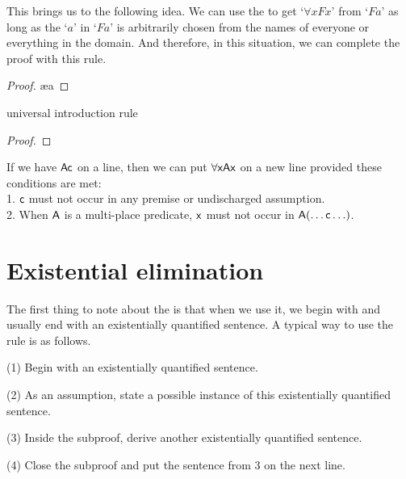 This brings us to the following idea. We can use the  to get `$\forall x Fx$' from `$Fa$' as long as the `$a$' in `$Fa$' is arbitrarily chosen from the names of everyone or everything in the domain. And therefore, in this situation, we can complete the proof with this rule.

\begin{proof}
	 \pr{}
	 
	 \ae{a}
	 
\end{proof}

\begin{factboxy}{universal introduction rule}
\begin{proof}
	 
\end{proof}

\small{If we have $\mathsf{Ac}$ on a line, then we can put $\forall \mathsf{xAx}$ on a new line provided these conditions are met:\\
1. $\mathsf{c}$ must not occur in any premise or undischarged assumption.\\
2. When $\mathsf{A}$ is a multi-place predicate, $\mathsf{x}$ must not occur in $\mathsf{A(\ldots c\ldots)}$.
}
\end{factboxy}



\section{Existential elimination}

The first thing to note about the  is that when we use it, we begin with and usually end with an existentially quantified sentence. A typical way to use the rule is as follows. 

\begin{ebullet}
\item[(1)] Begin with an existentially quantified sentence. 
\item[(2)] As an assumption, state a possible instance of this existentially quantified sentence. 
\item[(3)] Inside the subproof, derive another existentially quantified sentence.
\item[(4)] Close the subproof and put the sentence from 3 on the next line. 
\end{ebullet}

